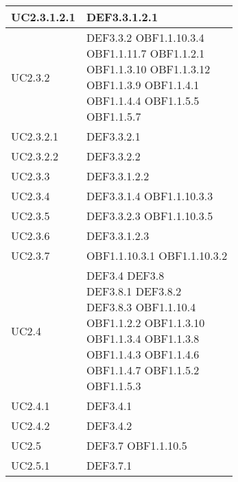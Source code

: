\documentclass{scalatekids-article}
\begin{document}
\begin{longtable}[H]{|p{5.5cm}|p{5.5cm}|}
  \hline
  UC2.3.1.2.1 & \multiLineCell[t]{DEF3.3.1.2.1\\}\\
  \hline
  UC2.3.2 & \multiLineCell[t]{DEF3.3.2 OBF1.1.10.3.4\\OBF1.1.11.7 OBF1.1.2.1\\OBF1.1.3.10 OBF1.1.3.12\\OBF1.1.3.9 OBF1.1.4.1\\OBF1.1.4.4 OBF1.1.5.5\\OBF1.1.5.7\\}\\
  \hline
  UC2.3.2.1 & \multiLineCell[t]{DEF3.3.2.1\\}\\
  \hline
  UC2.3.2.2 & \multiLineCell[t]{DEF3.3.2.2\\}\\
  \hline
  UC2.3.3 & \multiLineCell[t]{DEF3.3.1.2.2\\}\\
  \hline
  UC2.3.4 & \multiLineCell[t]{DEF3.3.1.4 OBF1.1.10.3.3\\}\\
  \hline
  UC2.3.5 & \multiLineCell[t]{DEF3.3.2.3 OBF1.1.10.3.5\\}\\
  \hline
  UC2.3.6 & \multiLineCell[t]{DEF3.3.1.2.3\\}\\
  \hline
  UC2.3.7 & \multiLineCell[t]{OBF1.1.10.3.1 OBF1.1.10.3.2\\}\\
  \hline
  UC2.4 & \multiLineCell[t]{DEF3.4 DEF3.8\\DEF3.8.1 DEF3.8.2\\DEF3.8.3 OBF1.1.10.4\\OBF1.1.2.2 OBF1.1.3.10\\OBF1.1.3.4 OBF1.1.3.8\\OBF1.1.4.3 OBF1.1.4.6\\OBF1.1.4.7 OBF1.1.5.2\\OBF1.1.5.3\\}\\
  \hline
  UC2.4.1 & \multiLineCell[t]{DEF3.4.1\\}\\
  \hline
  UC2.4.2 & \multiLineCell[t]{DEF3.4.2\\}\\
  \hline
  UC2.5 & \multiLineCell[t]{DEF3.7 OBF1.1.10.5\\}\\
  \hline
  UC2.5.1 & \multiLineCell[t]{DEF3.7.1\\}\\

\end{longtable}
\end{document}
